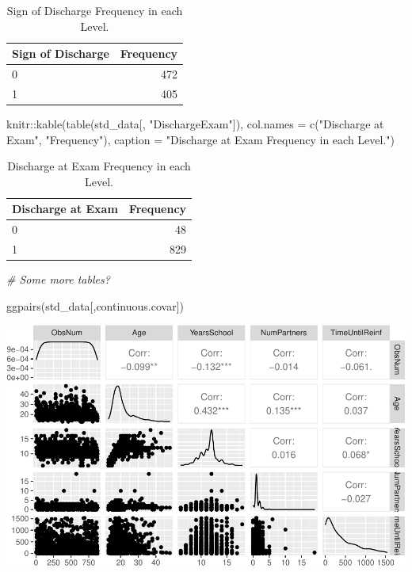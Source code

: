 \documentclass[
]{article}
\newenvironment{Shaded}{\begin{snugshade}}{\end{snugshade}}
\newcommand{\AttributeTok}[1]{\textcolor[rgb]{0.77,0.63,0.00}{#1}}
\newcommand{\CommentTok}[1]{\textcolor[rgb]{0.56,0.35,0.01}{\textit{#1}}}
\newcommand{\FunctionTok}[1]{\textcolor[rgb]{0.00,0.00,0.00}{#1}}
\newcommand{\NormalTok}[1]{#1}
\newcommand{\SpecialCharTok}[1]{\textcolor[rgb]{0.00,0.00,0.00}{#1}}
\newcommand{\StringTok}[1]{\textcolor[rgb]{0.31,0.60,0.02}{#1}}
\begin{document}
\begin{table}

\caption{\label{tab:unnamed-chunk-5}Sign of Discharge Frequency in each Level.}
\centering
\begin{tabular}[t]{l|r}
\hline
Sign of Discharge & Frequency\\
\hline
0 & 472\\
\hline
1 & 405\\
\hline
\end{tabular}
\end{table}

\begin{Shaded}
\begin{Highlighting}[]
\NormalTok{knitr}\SpecialCharTok{::}\FunctionTok{kable}\NormalTok{(}\FunctionTok{table}\NormalTok{(std\_data[, }\StringTok{"DischargeExam"}\NormalTok{]), }\AttributeTok{col.names =} \FunctionTok{c}\NormalTok{(}\StringTok{"Discharge at Exam"}\NormalTok{, }\StringTok{"Frequency"}\NormalTok{), }\AttributeTok{caption =} \StringTok{"Discharge at Exam Frequency in each Level."}\NormalTok{)}
\end{Highlighting}
\end{Shaded}

\begin{table}

\caption{\label{tab:unnamed-chunk-5}Discharge at Exam Frequency in each Level.}
\centering
\begin{tabular}[t]{l|r}
\hline
Discharge at Exam & Frequency\\
\hline
0 & 48\\
\hline
1 & 829\\
\hline
\end{tabular}
\end{table}

\begin{Shaded}
\begin{Highlighting}[]
\CommentTok{\# Some more tables?}
\end{Highlighting}
\end{Shaded}

\begin{Shaded}
\begin{Highlighting}[]
\FunctionTok{ggpairs}\NormalTok{(std\_data[,continuous.covar])}
\end{Highlighting}
\end{Shaded}

\includegraphics{practical_files/figure-latex/unnamed-chunk-6-1.pdf}
\end{document}
